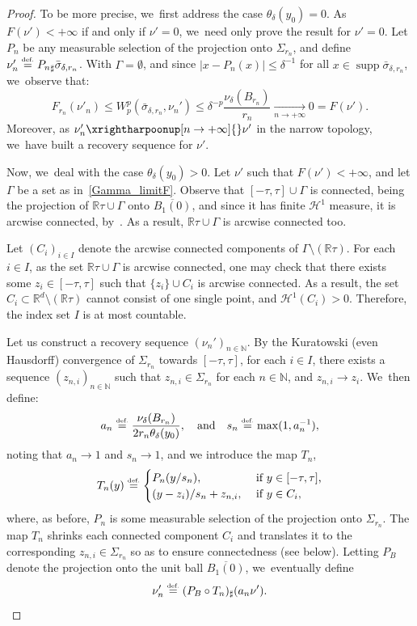 \documentclass[10pt]{amsart}
\theoremstyle{definition}
\newcommand{\eqdef}{\ensuremath{\stackrel{\mbox{\upshape\tiny def.}}{=}}}
\newcommand\cH{\mathcal{H}}
\newcommand{\RR}{\mathbb{R}}
\DeclareMathOperator{\supp}{supp}
\newcommand{\abs}[1]{\left\lvert#1\right\rvert}
\begin{document}
\begin{proof}
To be more precise, we~first address the case $\theta_\delta(y_0)=0$. As $F(\nu')<+\infty$ if and only if $\nu'=0$, we~need only prove the result for $\nu'=0$. Let $P_n$ be any measurable selection of the projection onto ${\Sigma_{r_n}}$, and define $\nu_n'\eqdef {P_n}_{\sharp} \bar \sigma_{\delta, r_n}$. With $\Gamma=\emptyset$, and since $\abs{x-P_n(x)}\le \delta^{-1}$ for all $x\in \supp \bar \sigma_{\delta,r_n}$, we~observe that:
\[
F_{r_n}(\nu'_n)\le W_p^p(\bar \sigma_{\delta, r_n},\nu_n')\le \delta^{-p} \frac{\nu_\delta(B_{r_n})}{r_n} \xrightarrow[n\to +\infty]{} 0 = F(\nu').
\]
Moreover, as $\nu'_n \xrightharpoonup[n \to +\infty]{} \nu'$ in the narrow topology, we~have built a recovery sequence for $\nu'$.

Now, we~deal with the case $\theta_{\delta}(y_0)>0$. Let $\nu'$ such that $F(\nu') < +\infty$, and let $\Gamma$ be a set as in~\eqref{Gamma_limitF}. Observe that $[-\tau,\tau]\cup \Gamma$ is connected, being the projection of $\RR\tau\cup \Gamma$ onto $\overline{B_1(0)}$, and since it has finite $\cH^1$ measure, it is arcwise connected, by~\cite[Prop.\,30.1, Cor.\,30.2]{david2006singular}. As a result, $\RR\tau\cup\Gamma$ is arcwise connected too.

Let $(C_{i})_{i\in I}$ denote the arcwise connected components of $\Gamma\setminus (\RR\tau)$. For each $i \in I$, as the set $\RR\tau\cup \Gamma$ is arcwise connected, one may check that there exists some $z_i\in [-\tau,\tau]$ such that $\{z_{i}\}\cup C_{i}$ is arcwise connected. As a result, the set $C_{i} \subset \RR^{d}\setminus(\RR\tau)$ cannot consist of one single point, and $\cH^1(C_i)>0$. Therefore, the index set $I$ is at most countable.

Let us construct a recovery sequence $(\nu_n')_{n\in \mathbb{N}}$. By the Kuratowski (even Hausdorff) convergence of $\Sigma_{r_{n}}$
towards $[-\tau,\tau]$, for each $i\in I$, there exists a sequence $(z_{n,i})_{n\in \mathbb{N}}$ such that $z_{n,i}\in \Sigma_{r_{n}}$ for each $n\in \mathbb{N}$, and $z_{n,i}\to z_i$. We~then define:
\begin{equation*}
a_n\eqdef \frac{\nu_{\delta}(B_{r_n})}{2r_n\theta_{\delta}(y_0)},
\quad\mbox{and}\quad
s_n\eqdef \max(1,a_{n}^{-1}),
\end{equation*}
noting that $a_n\to 1$ and $s_n\to 1$, and we introduce the map $T_n$,
\[
T_n(y)
\eqdef
\begin{cases}
P_n(y/s_{n}),& \text{ if $y \in [-\tau, \tau]$,} \\
(y-z_{i})/s_n+z_{n,i},& \text{ if $y \in C_i$},
\end{cases}
\]
where, as before, $P_n$ is some measurable selection of the projection onto ${\Sigma_{r_n}}$. The map $T_n$ shrinks each connected component $C_i$ and translates it to the corresponding $z_{n,i} \in \Sigma_{r_n}$ so as to ensure connectedness (see below). Letting $P_B$ denote the projection onto the unit ball $\overline{B_1(0)}$, we~eventually define
\[
\nu_n'\eqdef (P_B\circ T_n)_{\sharp}(a_n\nu').
\]


\end{proof}
\end{document}
